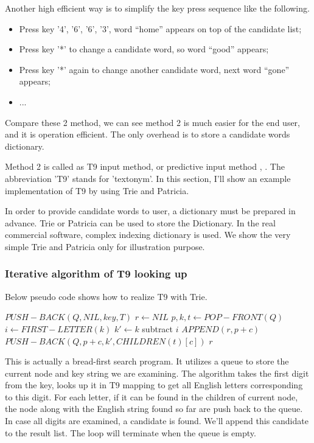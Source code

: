 \documentclass{article}
\begin{document}
Another high efficient way is to simplify the key press sequence like the
following.

\begin{itemize}
\item Press key '4', '6', '6', '3', word ``home'' appears on top of the candidate list;
\item Press key '*' to change a candidate word, so word ``good'' appears;
\item Press key '*' again to change another candidate word, next word ``gone'' appears;
\item ...
\end{itemize}

Compare these 2 method, we can see method 2 is much easier for the end user, and
it is operation efficient. The only overhead is to store a candidate words dictionary.

Method 2 is called as T9 input method, or predictive input method
\cite{wiki-t9}, \cite {wiki-predictive-text}. The abbreviation 'T9' stands
for 'textonym'. In this section, I'll show an example implementation of T9
by using Trie and Patricia.

In order to provide candidate words to user, a dictionary must be prepared
in advance. Trie or Patricia can be used to store the Dictionary. In the real
commercial software, complex indexing dictionary is used. We show the very
simple Trie and Patricia only for illustration purpose.

\subsubsection{Iterative algorithm of T9 looking up}

Below pseudo code shows how to realize T9 with Trie.

\begin{algorithmic}[1]
  \State $PUSH-BACK(Q, NIL, key, T)$
  \State $r \leftarrow NIL$
    \State $p, k, t \leftarrow POP-FRONT(Q)$
    \State $i \leftarrow FIRST-LETTER(k)$
        \State $k' \leftarrow k$ subtract $i$
          \State $APPEND(r, p+c)$
        \Else
          \State $PUSH-BACK(Q, p+c, k', CHILDREN(t)[c])$
        \EndIf
      \EndIf
    \EndFor
  \EndWhile
  \State \Return $r$
\EndFunction
\end{algorithmic}

This is actually a bread-first search program. It utilizes a queue to store
the current node and key string we are examining. The algorithm takes the first
digit from the key, looks up it in T9 mapping to get all English letters
corresponding to this digit. For each letter, if it can be found in the children
of current node, the node along with the English string found so far are
push back to the queue. In case all digits are examined, a candidate is found.
We'll append this candidate to the result list. The loop will terminate when
the queue is empty.
\end{document}
